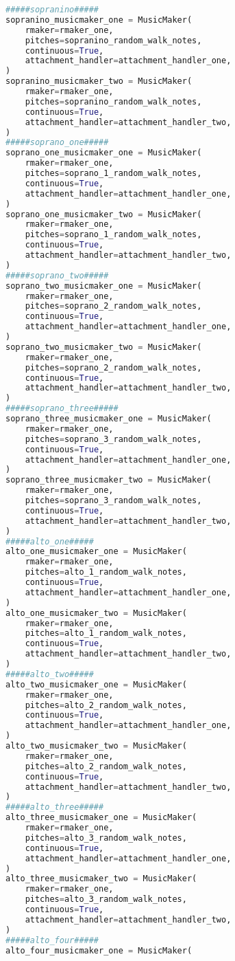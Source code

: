 \begin{lstlisting}[language=Python, caption=Invocation Source Code]
#####sopranino#####
sopranino_musicmaker_one = MusicMaker(
    rmaker=rmaker_one,
    pitches=sopranino_random_walk_notes,
    continuous=True,
    attachment_handler=attachment_handler_one,
)
sopranino_musicmaker_two = MusicMaker(
    rmaker=rmaker_one,
    pitches=sopranino_random_walk_notes,
    continuous=True,
    attachment_handler=attachment_handler_two,
)
#####soprano_one#####
soprano_one_musicmaker_one = MusicMaker(
    rmaker=rmaker_one,
    pitches=soprano_1_random_walk_notes,
    continuous=True,
    attachment_handler=attachment_handler_one,
)
soprano_one_musicmaker_two = MusicMaker(
    rmaker=rmaker_one,
    pitches=soprano_1_random_walk_notes,
    continuous=True,
    attachment_handler=attachment_handler_two,
)
#####soprano_two#####
soprano_two_musicmaker_one = MusicMaker(
    rmaker=rmaker_one,
    pitches=soprano_2_random_walk_notes,
    continuous=True,
    attachment_handler=attachment_handler_one,
)
soprano_two_musicmaker_two = MusicMaker(
    rmaker=rmaker_one,
    pitches=soprano_2_random_walk_notes,
    continuous=True,
    attachment_handler=attachment_handler_two,
)
#####soprano_three#####
soprano_three_musicmaker_one = MusicMaker(
    rmaker=rmaker_one,
    pitches=soprano_3_random_walk_notes,
    continuous=True,
    attachment_handler=attachment_handler_one,
)
soprano_three_musicmaker_two = MusicMaker(
    rmaker=rmaker_one,
    pitches=soprano_3_random_walk_notes,
    continuous=True,
    attachment_handler=attachment_handler_two,
)
#####alto_one#####
alto_one_musicmaker_one = MusicMaker(
    rmaker=rmaker_one,
    pitches=alto_1_random_walk_notes,
    continuous=True,
    attachment_handler=attachment_handler_one,
)
alto_one_musicmaker_two = MusicMaker(
    rmaker=rmaker_one,
    pitches=alto_1_random_walk_notes,
    continuous=True,
    attachment_handler=attachment_handler_two,
)
#####alto_two#####
alto_two_musicmaker_one = MusicMaker(
    rmaker=rmaker_one,
    pitches=alto_2_random_walk_notes,
    continuous=True,
    attachment_handler=attachment_handler_one,
)
alto_two_musicmaker_two = MusicMaker(
    rmaker=rmaker_one,
    pitches=alto_2_random_walk_notes,
    continuous=True,
    attachment_handler=attachment_handler_two,
)
#####alto_three#####
alto_three_musicmaker_one = MusicMaker(
    rmaker=rmaker_one,
    pitches=alto_3_random_walk_notes,
    continuous=True,
    attachment_handler=attachment_handler_one,
)
alto_three_musicmaker_two = MusicMaker(
    rmaker=rmaker_one,
    pitches=alto_3_random_walk_notes,
    continuous=True,
    attachment_handler=attachment_handler_two,
)
#####alto_four#####
alto_four_musicmaker_one = MusicMaker(

\end{lstlisting}
